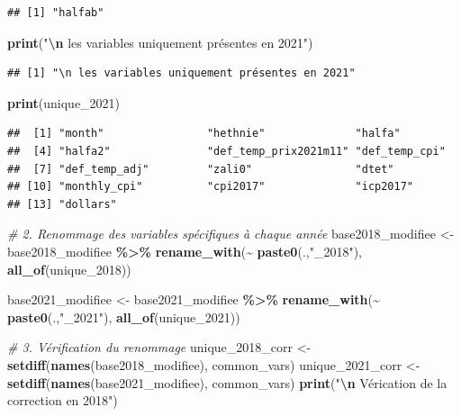 \documentclass[
]{article}
\newenvironment{Shaded}{\begin{snugshade}}{\end{snugshade}}
\newcommand{\CommentTok}[1]{\textcolor[rgb]{0.56,0.35,0.01}{\textit{#1}}}
\newcommand{\FunctionTok}[1]{\textcolor[rgb]{0.13,0.29,0.53}{\textbf{#1}}}
\newcommand{\NormalTok}[1]{#1}
\newcommand{\OtherTok}[1]{\textcolor[rgb]{0.56,0.35,0.01}{#1}}
\newcommand{\SpecialCharTok}[1]{\textcolor[rgb]{0.81,0.36,0.00}{\textbf{#1}}}
\newcommand{\StringTok}[1]{\textcolor[rgb]{0.31,0.60,0.02}{#1}}
\begin{document}
\begin{verbatim}
## [1] "halfab"
\end{verbatim}

\begin{Shaded}
\begin{Highlighting}[]
\FunctionTok{print}\NormalTok{(}\StringTok{"}\SpecialCharTok{\textbackslash{}n}\StringTok{ les variables uniquement présentes en 2021"}\NormalTok{)}
\end{Highlighting}
\end{Shaded}

\begin{verbatim}
## [1] "\n les variables uniquement présentes en 2021"
\end{verbatim}

\begin{Shaded}
\begin{Highlighting}[]
\FunctionTok{print}\NormalTok{(unique\_2021)}
\end{Highlighting}
\end{Shaded}

\begin{verbatim}
##  [1] "month"                "hethnie"              "halfa"               
##  [4] "halfa2"               "def_temp_prix2021m11" "def_temp_cpi"        
##  [7] "def_temp_adj"         "zali0"                "dtet"                
## [10] "monthly_cpi"          "cpi2017"              "icp2017"             
## [13] "dollars"
\end{verbatim}

\begin{Shaded}
\begin{Highlighting}[]
\CommentTok{\# 2. Renommage des variables spécifiques à chaque année}
\NormalTok{base2018\_modifiee }\OtherTok{\textless{}{-}}\NormalTok{ base2018\_modifiee }\SpecialCharTok{\%\textgreater{}\%} 
  \FunctionTok{rename\_with}\NormalTok{(}\SpecialCharTok{\textasciitilde{}} \FunctionTok{paste0}\NormalTok{(.,}\StringTok{"\_2018"}\NormalTok{), }\FunctionTok{all\_of}\NormalTok{(unique\_2018))}

\NormalTok{base2021\_modifiee }\OtherTok{\textless{}{-}}\NormalTok{ base2021\_modifiee }\SpecialCharTok{\%\textgreater{}\%} 
  \FunctionTok{rename\_with}\NormalTok{(}\SpecialCharTok{\textasciitilde{}} \FunctionTok{paste0}\NormalTok{(.,}\StringTok{"\_2021"}\NormalTok{), }\FunctionTok{all\_of}\NormalTok{(unique\_2021))}

\CommentTok{\# 3. Vérification du renommage}
\NormalTok{unique\_2018\_corr  }\OtherTok{\textless{}{-}} \FunctionTok{setdiff}\NormalTok{(}\FunctionTok{names}\NormalTok{(base2018\_modifiee), common\_vars)}
\NormalTok{unique\_2021\_corr  }\OtherTok{\textless{}{-}} \FunctionTok{setdiff}\NormalTok{(}\FunctionTok{names}\NormalTok{(base2021\_modifiee), common\_vars)}
\FunctionTok{print}\NormalTok{(}\StringTok{"}\SpecialCharTok{\textbackslash{}n}\StringTok{ Vérication de la correction en 2018"}\NormalTok{)}
\end{Highlighting}
\end{Shaded}
\end{document}
